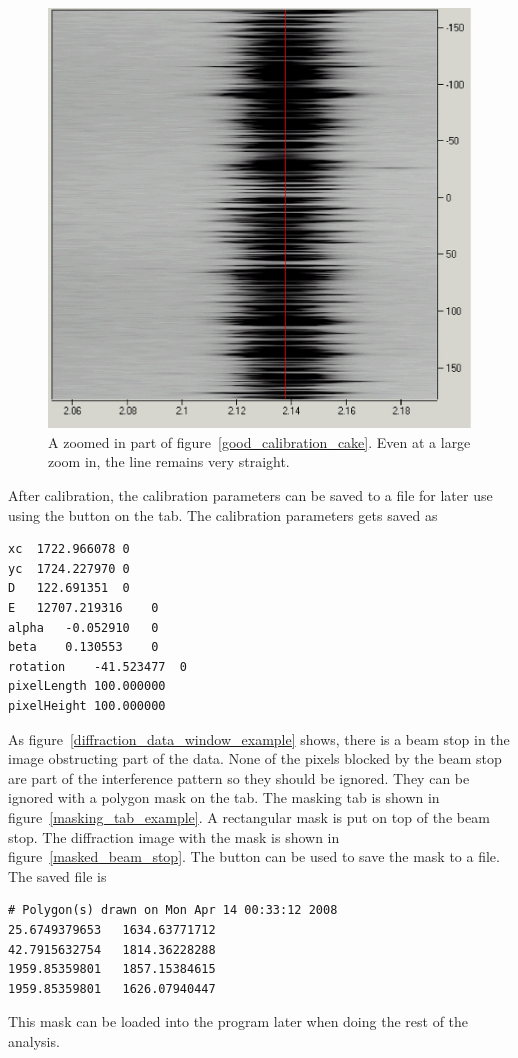 \begin{figure}
    \centering
    \includegraphics[scale=.75]
    {figures/good_calibration_cake_zoom.eps}
    \caption{A zoomed in part of figure~\ref{good_calibration_cake}. 
    Even at a large zoom in, the line remains very straight.}
    \label{good_calibration_cake_zoom}
\end{figure}

After calibration, the calibration parameters can be saved to 
a file for later use using the  button on the 
 tab. The calibration parameters gets saved as
\begin{lstlisting}[caption={'C:/Data/LaB6\_cal.dat'}]
xc	1722.966078	0
yc	1724.227970	0
D	122.691351	0
E	12707.219316	0
alpha	-0.052910	0
beta	0.130553	0
rotation	-41.523477	0
pixelLength	100.000000
pixelHeight	100.000000
\end{lstlisting}

As figure~\ref{diffraction_data_window_example} shows,
there is a beam stop in the image obstructing part of the data. 
None of the pixels blocked by the beam stop are part of the interference
pattern so they should be ignored. They can be ignored with a polygon mask
on the  tab. The masking tab is shown in 
figure~\ref{masking_tab_example}. A rectangular mask is 
put on top of the beam stop. The diffraction image with
the mask is shown in
figure~\ref{masked_beam_stop}.
The  button can be used to save the mask
to a file. The saved file is
\begin{lstlisting}[caption={'beam\_stop\_mask.dat'}]
# Polygon(s) drawn on Mon Apr 14 00:33:12 2008
25.6749379653	1634.63771712
42.7915632754	1814.36228288
1959.85359801	1857.15384615
1959.85359801	1626.07940447
\end{lstlisting}
This mask can be loaded into the program later when
doing the rest of the analysis.

